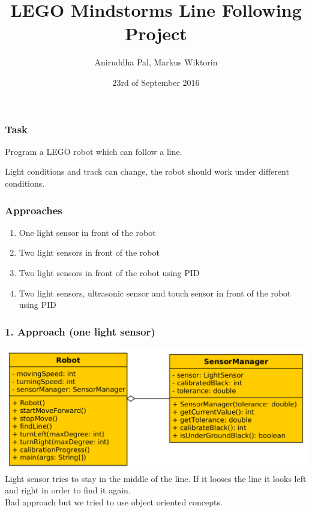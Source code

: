 \documentclass{beamer}
\title{LEGO Mindstorms Line Following Project}
\author{Aniruddha Pal, Markus Wiktorin}
\date{23rd of September 2016}
\institute{University of Applied Science, Bonn-Rhein-Sieg}
\begin{document}
	\maketitle
	\begin{frame}
		\frametitle{Task}
		Program a LEGO robot which can follow a line.
		
		Light conditions and track can change, the robot should work under different conditions.
	\end{frame}
	\begin{frame}
		\frametitle{Approaches}
		\begin{enumerate}
			\item One light sensor in front of the robot
			\item Two light sensors in front of the robot
			\item Two light sensors in front of the robot using PID
			\item Two light sensors, ultrasonic sensor and touch sensor in front of the robot using PID
		\end{enumerate}
	\end{frame}
	\begin{frame}
		\frametitle{1. Approach (one light sensor)}
		\includegraphics[width=\textwidth, height=\textheight, keepaspectratio]{firstApproach.png}
		\\
		Light sensor tries to stay in the middle of the line. If it looses the line it looks left and right in order to find it again.
		\\
		Bad approach but we tried to use object oriented concepts.
	\end{frame}
\end{document}
